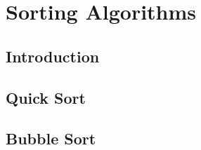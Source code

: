 \documentclass[../maths.tex]{subfiles}
\begin{document}
\chapter{Sorting Algorithms}
\section{Introduction}
\section{Quick Sort}
\section{Bubble Sort}
\end{document}

